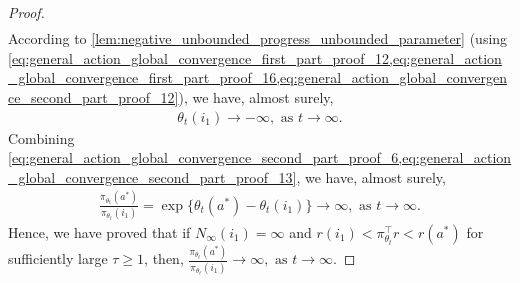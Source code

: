 \begin{proof}
\begin{align}
\end{align}
According to \cref{lem:negative_unbounded_progress_unbounded_parameter} (using \cref{eq:general_action_global_convergence_first_part_proof_12,eq:general_action_global_convergence_first_part_proof_16,eq:general_action_global_convergence_second_part_proof_12}), we have, almost surely, 
\begin{align}
\label{eq:general_action_global_convergence_second_part_proof_13}
    \theta_t(i_1) \to  - \infty, \text{ as } t \to \infty.
\end{align}
Combining \cref{eq:general_action_global_convergence_second_part_proof_6,eq:general_action_global_convergence_second_part_proof_13}, we have, almost surely,
\begin{align}
\label{eq:general_action_global_convergence_second_part_proof_14}
    \frac{ \pi_{\theta_t}(a^*) }{ \pi_{\theta_t}(i_1)} = \exp\{ \theta_t(a^*) - \theta_t(i_1) \} \to \infty, \text{ as } t \to \infty.
\end{align}
Hence, we have proved that if $N_\infty(i_1) = \infty$ and $r(i_1) < \pi_{\theta_t}^\top r < r(a^*)$ for sufficiently large $\tau \geq 1$, then, $\frac{ \pi_{\theta_t}(a^*) }{ \pi_{\theta_t}(i_1)} \to \infty, \text{ as } t \to \infty$. 


\end{proof}
